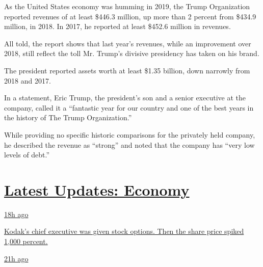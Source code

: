 As the United States economy was humming in 2019, the Trump Organization
reported revenues of at least \$446.3 million, up more than 2 percent
from \$434.9 million, in 2018. In 2017, he reported at least \$452.6
million in revenues.

All told, the report shows that last year's revenues, while an
improvement over 2018, still reflect the toll Mr. Trump's divisive
presidency has taken on his brand.

The president reported assets worth at least \$1.35 billion, down
narrowly from 2018 and 2017.

In a statement, Eric Trump, the president's son and a senior executive
at the company, called it a ``fantastic year for our country and one of
the best years in the history of The Trump Organization.''

While providing no specific historic comparisons for the privately held
company, he described the revenue as ``strong'' and noted that the
company has ``very low levels of debt.''

\hypertarget{latest-updates-economy}{%
\section{\texorpdfstring{\href{https://www.nytimes.com/live/2020/07/31/business/stock-market-today-coronavirus?action=click\&pgtype=Article\&state=default\&region=MAIN_CONTENT_1\&context=storylines_live_updates}{Latest
Updates:
Economy}}{Latest Updates: Economy}}\label{latest-updates-economy}}

\href{https://www.nytimes.com/live/2020/07/31/business/stock-market-today-coronavirus?action=click\&pgtype=Article\&state=default\&region=MAIN_CONTENT_1\&context=storylines_live_updates\#kodaks-chief-executive-was-given-stock-options-then-the-share-price-spiked-1000-percent}{18h
ago}

\href{https://www.nytimes.com/live/2020/07/31/business/stock-market-today-coronavirus?action=click\&pgtype=Article\&state=default\&region=MAIN_CONTENT_1\&context=storylines_live_updates\#kodaks-chief-executive-was-given-stock-options-then-the-share-price-spiked-1000-percent}{Kodak's
chief executive was given stock options. Then the share price spiked
1,000 percent.}

\href{https://www.nytimes.com/live/2020/07/31/business/stock-market-today-coronavirus?action=click\&pgtype=Article\&state=default\&region=MAIN_CONTENT_1\&context=storylines_live_updates\#fitch-ratings-downgrades-its-outlook-on-us-debt}{21h
ago}

